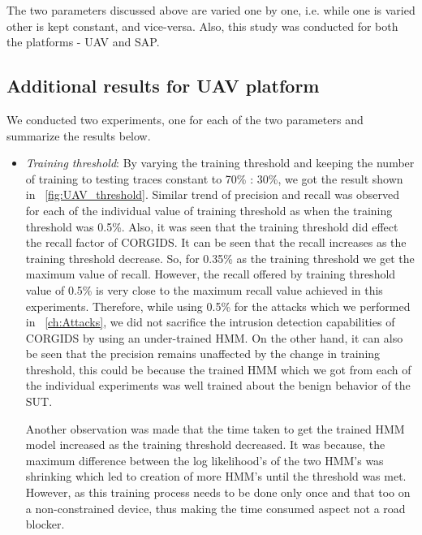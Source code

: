 The two parameters discussed above are varied one by one, i.e. while one is varied other is kept constant, and vice-versa. Also, this study was conducted for both the platforms - UAV and SAP.

\subsection{Additional results for UAV platform}
We conducted two experiments, one for each of the two parameters and summarize the results below.

\begin{itemize}

\item \textit{Training threshold}: By varying the training threshold and keeping the number of training to testing traces constant to 70\% : 30\%, we got the result shown in ~\autoref{fig:UAV_threshold}. Similar trend of precision and recall was observed for each of the individual value of training threshold as when the training threshold was 0.5\%. Also, it was seen that the training threshold did effect the recall factor of CORGIDS. It can be seen that the recall increases as the training threshold decrease. So, for 0.35\% as the training threshold we get the maximum value of recall. However, the recall offered by training threshold value of 0.5\% is very close to the maximum recall value achieved in this experiments. Therefore, while using 0.5\% for the attacks which we performed in ~\autoref{ch:Attacks}, we did not sacrifice the intrusion detection capabilities of CORGIDS by using an under-trained HMM. On the other hand, it can also be seen that the precision remains unaffected by the change in training threshold, this could be because the trained HMM which we got from each of the individual experiments was well trained about the benign behavior of the SUT.

Another observation was made that the time taken to get the trained HMM model increased as the training threshold decreased. It was because, the maximum difference between the log likelihood's of the two HMM's was shrinking which led to creation of more HMM's until the threshold was met. However, as this training process needs to be done only once and that too on a non-constrained device, thus making the time consumed aspect not a road blocker.


\end{itemize}
